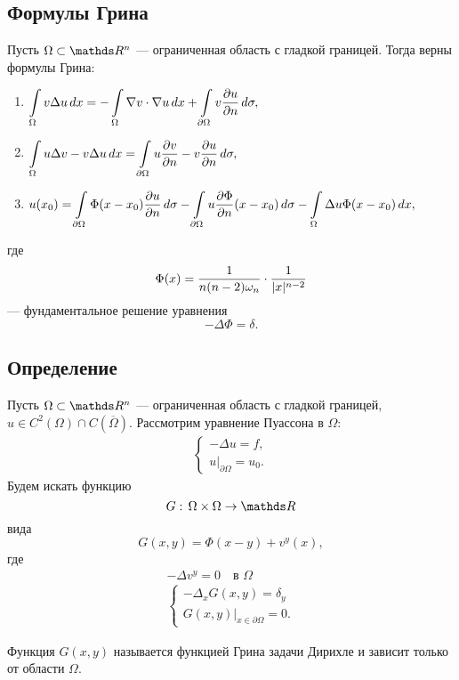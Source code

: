 \subsection{Формулы Грина}
Пусть $\Omega \subset \real^n$ --- ограниченная область с гладкой границей. Тогда верны формулы Грина:
\begin{enumerate}
\item $\displaystyle \int \limits_\Omega v \Delta u \, dx = - \int \limits_\Omega \nabla v \cdot \nabla u \, dx + \int \limits_{\partial \Omega} v \pder[u]{n} \, d\sigma,$
\item $\displaystyle \int \limits_\Omega u \Delta v - v \Delta u \, dx = \int \limits_{\partial \Omega} u \pder[v]{n} - v \pder[u]{n} \, d\sigma,$
\item $\displaystyle u(x_0) = \int \limits_{\partial \Omega} \Phi (x-x_0) \pder[u]{n} \, d\sigma - \int \limits_{\partial \Omega} u \pder[\Phi]{n} (x-x_0) \, d\sigma - \int \limits_\Omega \Delta u \Phi (x - x_0) \, dx,$
\end{enumerate}
где 
$$ \Phi(x) = \frac {1} {n (n-2) \omega_n} \cdot \frac {1} {\abs{x}^{n-2}}$$
--- фундаментальное решение уравнения $$-\Delta \Phi = \delta.$$

\subsection{Определение}
Пусть $\Omega \subset \real^n$ --- ограниченная область с гладкой границей, $u \in C^2(\Omega) \cap C(\overline{\Omega})$. Рассмотрим уравнение Пуассона в $\Omega$:
\begin{align*}
	\begin{cases*}
		- \Delta u = f, \\
		u\Big\rvert_{\partial \Omega} = u_0.
	\end{cases*}
\end{align*}
Будем искать функцию
$$G: \, \Omega \times \Omega \rightarrow \real$$ вида
$$G(x,y) = \Phi (x-y) + v^y (x),$$
где
\begin{gather*}
	- \Delta v^y = 0 \quad \text{в $\Omega$} \\
	\begin{cases*}
		- \Delta_x G(x,y) = \delta_y \\
		G(x,y)\Big\rvert_{x \in \partial \Omega} = 0.
	\end{cases*}
\end{gather*}
\begin{definition}
Функция $G(x,y)$ называется функцией Грина задачи Дирихле и зависит только от области $\Omega$.
\end{definition}

